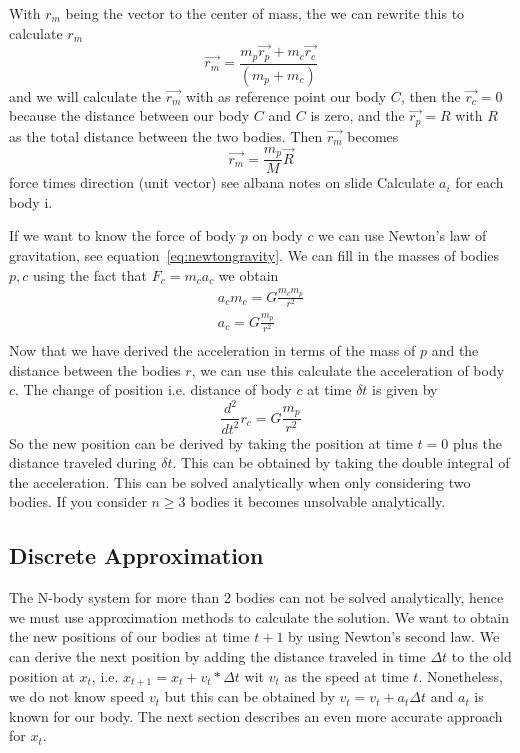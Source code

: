 \documentclass[11pt]{article} %
\begin{document}
With $r_m$ being the vector to the center of mass, the we can rewrite this to calculate $r_m$
\begin{equation}
	\overrightarrow{r_m} = \frac{m_p\overrightarrow{r_p} + m_c\overrightarrow{r_c}}{(m_p + m_c)}
\end{equation}
and we will calculate the $\overrightarrow{r_m}$ with as reference point our body $C$, then the $\overrightarrow{r_c}=0$ because the distance between our body $C$ and $C$ is zero, and the $\overrightarrow{r_p}=R$ with $R$ as the total distance between the two bodies. Then $\overrightarrow{r_m}$ becomes
\begin{equation}
	\overrightarrow{r_m} = \frac{m_p}{M}\overrightarrow{R}
\end{equation}
force times direction (unit vector) see albana notes on slide
Calculate $a_i$ for each body i.


If we want to know the force of body $p$ on body $c$ we can use Newton's law of gravitation, see equation~\ref{eq:newtongravity}.  We can fill in the masses of bodies $p,c$ using the fact that $F_c = m_c a_c$ we obtain
\begin{equation}
    \begin{split}
     a_c m_c = G\frac{m_c m_p}{r^2} \\
     a_c = G\frac{m_p}{r^2} \\
    \end{split}
\end{equation}
Now that we have derived the acceleration in terms of the mass of $p$ and the distance between the bodies $r$, we can use this calculate the acceleration of body $c$. The change of position i.e. distance of body $c$ at time $\delta t$ is given by
\begin{equation}
    \frac{d^2}{dt^2} r_c = G \frac{m_p}{r^2}
\end{equation}
So the new position can be derived by taking the position at time $t=0$ plus the distance traveled during $\delta t$. This can be obtained by taking the double integral of the acceleration. This can be solved analytically when only considering two bodies. If you consider $n \geq 3$ bodies it becomes unsolvable analytically. 
\subsection{Discrete Approximation}
The N-body system for more than 2 bodies can not be solved analytically, hence we must use approximation methods to calculate the solution.
We want to obtain the new positions of our bodies at time $t+1$ by using Newton's second law. We can derive the next position by adding the distance traveled in time $\Delta t$ to the old position at $x_t$, i.e. $x_{t+1} = x_t + v_t*\Delta t$ wit $v_t$ as the speed at time $t$. Nonetheless, we do not know speed $v_t$ but this can be obtained by $v_t = v_t + a_t \Delta t$ and $a_t$ is known for our body. The next section describes an even more accurate approach for $x_t$.
\end{document}
